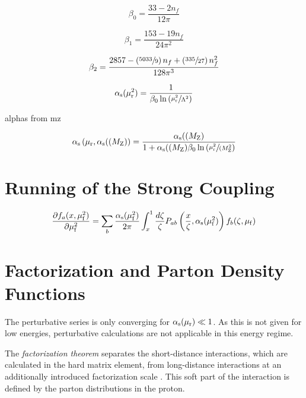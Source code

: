 \begin{equation} 
    \beta_0 = \frac{33 - 2 n_f}{12\pi}
\end{equation}

\begin{equation} 
    \beta_1 = \frac{153 - 19 n_f}{24\pi^2}
\end{equation}

\begin{equation} 
   \beta_2 = \frac{2857 -\left(\sfrac{5033}{9}\right)n_f + \left(\sfrac{335}{27}
   \right)n_f^2}{128 \pi^3}
\end{equation}

\begin{equation*}
   \alpha_\mathrm{s}(\mu_{\mathrm{r}}^2) = \frac{1}{\beta_0 \ln \left( \sfrac{\mu_{\mathrm{r}}^2}{\Lambda^2} \right)}
\end{equation*}


alphas from mz

\begin{equation*}
   \alpha_\mathrm{s}\left(\mu_{\mathrm{r}}, \alpha_\mathrm{s}((M_\mathrm{Z})\right) = \frac{\alpha_\mathrm{s}((M_\mathrm{Z})}{1 + \alpha_\mathrm{s}((M_\mathrm{Z})\beta_0 \ln
       \left( \sfrac{\mu_{\mathrm{r}}^2}{(M_\mathrm{Z}^2} \right)}
\end{equation*}



\section{Running of the Strong Coupling}

\begin{equation*}
    \frac{\partial f_a (x, \mu_{\mathrm{f}}^2)}{\partial \mu_{\mathrm{f}}^2} = \sum_b \frac{\alpha_\mathrm{s}(\mu_{\mathrm{f}}^2)}{2 \pi} \int_x^1
    \frac{d \zeta}{\zeta} P_{ab} \left(\frac{x}{\zeta},
    \alpha_\mathrm{s}(\mu_{\mathrm{f}}^2)\right) f_b(\zeta, \mu_{\mathrm{f}})
\end{equation*}



\section{Factorization and Parton Density Functions}

The perturbative series is only converging for $\alpha_\mathrm{s}(\mu_{\mathrm{r}}) \ll 1$. As this is not
given for low energies, perturbative calculations are not applicable in this
energy regime. 

The \emph{factorization theorem} separates the short-distance interactions,
which are calculated in the hard matrix element, from long-distance
interactions at an additionally introduced factorization scale \muf. This soft
part of the interaction is defined by the parton distributions in the proton.

